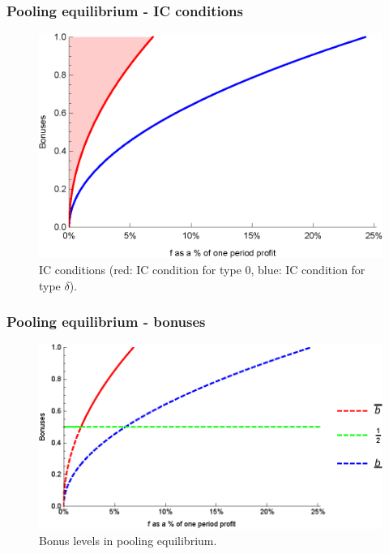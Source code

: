 \documentclass[xcolor=dvipsnames]{beamer}
\begin{document}
\begin{frame}
\frametitle{Pooling equilibrium - IC conditions}
\begin{figure}[h!]
\centering
\includegraphics[scale=0.7]{Plots/bonuses_diff_bonus_pool.eps}
\caption{IC conditions (red: IC condition for type $0$, blue: IC condition for type $\delta$).}\label{fig:pool_IC_bonuses}
\end{figure}
\end{frame}

\begin{frame}
\frametitle{Pooling equilibrium - bonuses}
\begin{figure}[h!]
\centering
\includegraphics[scale=0.7]{Plots/bonuses_diff_bonus_pool2.eps}
\caption{Bonus levels in pooling equilibrium.}\label{fig:bonuses_pooling}
\end{figure}
\end{frame}
\end{document}
